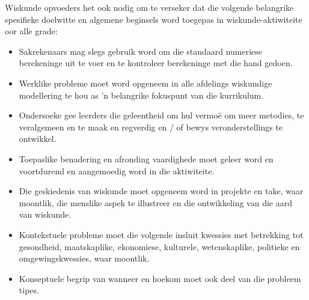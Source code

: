 Wiskunde opvoeders het ook nodig om te verseker dat die volgende belangrike spesifieke doelwitte en algemene beginsels word toegepas in wiskunde-aktiwiteite oor alle grade:
\begin{itemize}[noitemsep]
\item
Sakrekenaars mag slegs gebruik word om die standaard numeriese berekeninge uit te voer en te kontroleer berekeninge met die hand gedoen.
\item
Werklike probleme moet word opgeneem in alle afdelings wiskundige modellering te hou as 'n belangrike fokuspunt van die kurrikulum.
\item
Ondersoeke gee leerders die geleentheid om hul vermoë om meer metodies, te veralgemeen en te maak en regverdig en / of bewys veronderstellings te ontwikkel.
\item
Toepaslike benadering en afronding vaardighede moet geleer word en voortdurend en aangemoedig word in die aktiwiteite.
\item
Die geskiedenis van wiskunde moet opgeneem word in projekte en take, waar moontlik, die menslike aspek te illustreer en die ontwikkeling van die aard van wiskunde.
\item
Kontekstuele probleme moet die volgende insluit kwessies met betrekking tot gesondheid, maatskaplike, ekonomiese, kulturele, wetenskaplike, politieke en omgewingskwessies, waar moontlik.
\item
Konseptuele begrip van wanneer en hoekom moet ook deel van die probleem tipes.

\end{itemize}
